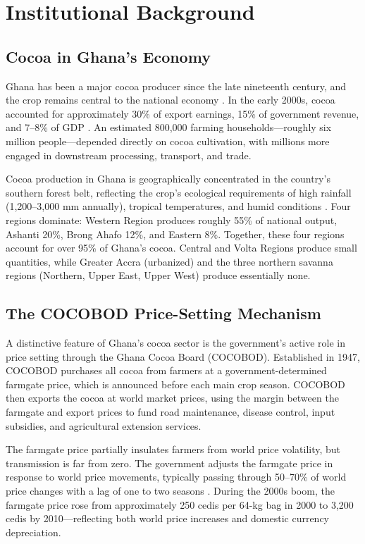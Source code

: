 \documentclass[12pt]{article}
\begin{document}
\section{Institutional Background}
\label{sec:background}

\subsection{Cocoa in Ghana's Economy}

Ghana has been a major cocoa producer since the late nineteenth century, and the crop remains central to the national economy \citep{aryeetey2008}. In the early 2000s, cocoa accounted for approximately 30\% of export earnings, 15\% of government revenue, and 7--8\% of GDP \citep{kolavalli2011}. An estimated 800,000 farming households---roughly six million people---depended directly on cocoa cultivation, with millions more engaged in downstream processing, transport, and trade.

Cocoa production in Ghana is geographically concentrated in the country's southern forest belt, reflecting the crop's ecological requirements of high rainfall (1,200--3,000 mm annually), tropical temperatures, and humid conditions \citep{vigneri2005}. Four regions dominate: Western Region produces roughly 55\% of national output, Ashanti 20\%, Brong Ahafo 12\%, and Eastern 8\%. Together, these four regions account for over 95\% of Ghana's cocoa. Central and Volta Regions produce small quantities, while Greater Accra (urbanized) and the three northern savanna regions (Northern, Upper East, Upper West) produce essentially none.

\subsection{The COCOBOD Price-Setting Mechanism}

A distinctive feature of Ghana's cocoa sector is the government's active role in price setting through the Ghana Cocoa Board (COCOBOD). Established in 1947, COCOBOD purchases all cocoa from farmers at a government-determined farmgate price, which is announced before each main crop season. COCOBOD then exports the cocoa at world market prices, using the margin between the farmgate and export prices to fund road maintenance, disease control, input subsidies, and agricultural extension services.

The farmgate price partially insulates farmers from world price volatility, but transmission is far from zero. The government adjusts the farmgate price in response to world price movements, typically passing through 50--70\% of world price changes with a lag of one to two seasons \citep{kolavalli2011}. During the 2000s boom, the farmgate price rose from approximately 250 cedis per 64-kg bag in 2000 to 3,200 cedis by 2010---reflecting both world price increases and domestic currency depreciation.
\end{document}
